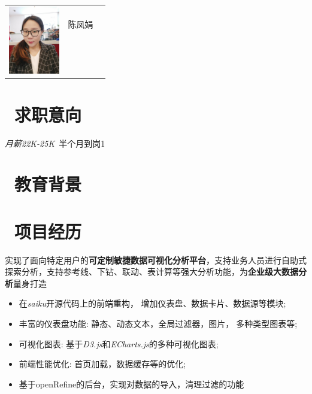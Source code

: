 \documentclass{resume}
\begin{document}

\Large{
  \begin{tabu}{ c l r }
    & \scshape{陈凤娟} & \\
    &  &  \\
    &  &  \\
    &  &  \\
    &  & 
  \end{tabu}
}

\normalsize
\section{\faInfo\  求职意向}
\textit{月薪22K-25K}\ 半个月到岗1

\section{\faGraduationCap\  教育背景}

\section{\faUsers\ 项目经历}
\begin{onehalfspacing}
实现了面向特定用户的\textbf{可定制敏捷数据可视化分析平台}，支持业务人员进行自助式探索分析，支持参考线、下钻、联动、表计算等强大分析功能，为\textbf{企业级大数据分析}量身打造
\begin{itemize}
\item 在\textit{saiku}开源代码上的前端重构， 增加仪表盘、数据卡片、数据源等模块;
\item 丰富的仪表盘功能: 静态、动态文本，全局过滤器，图片，多种类型图表等;
\item 可视化图表: 基于\textit{D3.js}和\textit{ECharts.js}的多种可视化图表;
\item 前端性能优化: 首页加载，数据缓存等的优化;
\item 基于openRefine的后台，实现对数据的导入，清理过滤的功能
\end{itemize}
\end{onehalfspacing}
\end{document}

